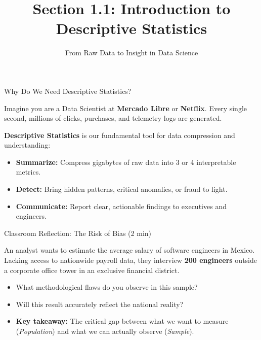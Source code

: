 \documentclass[aspectratio=169,xcolor={dvipsnames,table}]{beamer}
\title[Descriptive Statistics]{Section 1.1: Introduction to Descriptive Statistics}
\subtitle{From Raw Data to Insight in Data Science}
\begin{document}
\begin{frame}
  \titlepage
\end{frame}

\begin{frame}{Why Do We Need Descriptive Statistics?}
  \begin{motivacion}
    Imagine you are a Data Scientist at \textbf{Mercado Libre} or \textbf{Netflix}. Every single second, millions of clicks, purchases, and telemetry logs are generated.
  \end{motivacion}
  
  \vspace{0.6em}
  \textbf{Descriptive Statistics} is our fundamental tool for data compression and understanding:
  \begin{itemize}
    \item \textbf{Summarize:} Compress gigabytes of raw data into 3 or 4 interpretable metrics. \pause
    \item \textbf{Detect:} Bring hidden patterns, critical anomalies, or fraud to light. \pause
    \item \textbf{Communicate:} Report clear, actionable findings to executives and engineers.
  \end{itemize}
\end{frame}

\begin{frame}{Classroom Reflection: The Risk of Bias (2 min)}
  \begin{reflexion}
    An analyst wants to estimate the average salary of software engineers in Mexico. Lacking access to nationwide payroll data, they interview \textbf{200 engineers} outside a corporate office tower in an exclusive financial district.
  \end{reflexion}
  
  \vspace{0.8em}
  \pause
  \begin{itemize}
    \item What methodological flaws do you observe in this sample? \pause
    \item Will this result accurately reflect the national reality? \pause
    \item \textbf{Key takeaway:} The critical gap between what we want to measure (\emph{Population}) and what we can actually observe (\emph{Sample}).
  \end{itemize}
\end{frame}
\end{document}
